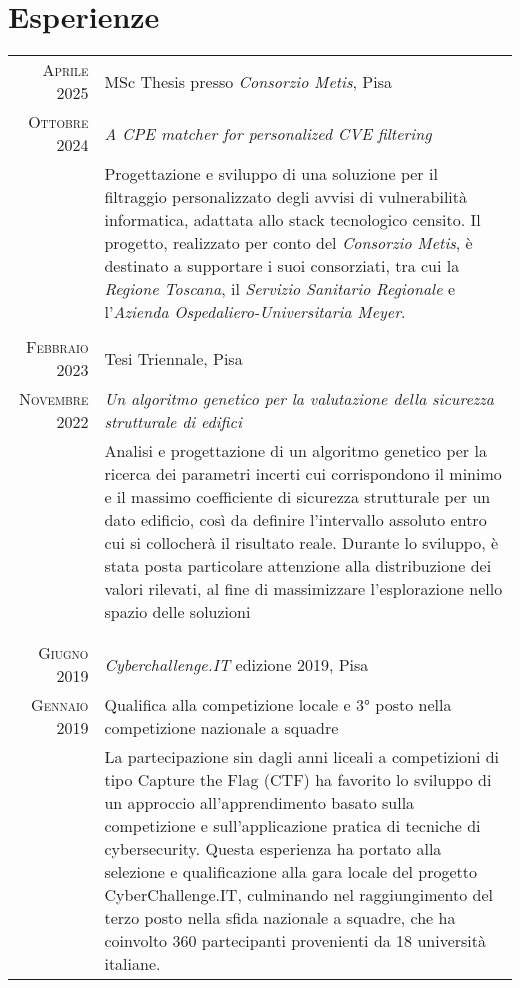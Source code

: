 \documentclass[a4paper,11pt]{article} %
\begin{document}
\section{Esperienze}

\begin{tabular}{r|p{12cm}}
\textsc{Aprile 2025} & MSc Thesis presso \emph{Consorzio Metis}, Pisa\\
\textsc{Ottobre 2024} & \emph{A CPE matcher for personalized CVE filtering}\\ 
& \footnotesize{Progettazione e sviluppo di una soluzione per il filtraggio personalizzato degli avvisi di vulnerabilità informatica, adattata allo stack tecnologico censito. Il progetto, realizzato per conto del \emph{Consorzio Metis}, è destinato a supportare i suoi consorziati, tra cui la \emph{Regione Toscana}, il \emph{Servizio Sanitario Regionale} e l’\emph{Azienda Ospedaliero-Universitaria Meyer}.}\\
\multicolumn{2}{c}{} \\
%
%
\textsc{Febbraio 2023} & Tesi Triennale, Pisa\\
\textsc{Novembre 2022} & \emph{Un algoritmo genetico per la valutazione della sicurezza strutturale di edifici}\\ 
& \footnotesize{Analisi e progettazione di un algoritmo genetico per la ricerca dei parametri incerti cui corrispondono il minimo e il massimo coefficiente di sicurezza strutturale per un dato edificio, così da definire l'intervallo assoluto entro cui si collocherà il risultato reale. Durante lo sviluppo, è stata posta particolare attenzione alla distribuzione dei valori rilevati, al fine di massimizzare l'esplorazione nello spazio delle soluzioni}\\
\\
\multicolumn{2}{c}{} \\
%
%
\textsc{Giugno 2019} & \emph{Cyberchallenge.IT} edizione 2019, Pisa\\
\textsc{Gennaio 2019} & Qualifica alla competizione locale e 3° posto nella competizione nazionale a squadre\\ 
& \footnotesize{La partecipazione sin dagli anni liceali a competizioni di tipo Capture the Flag (CTF) ha favorito lo sviluppo di un approccio all’apprendimento basato sulla competizione e sull’applicazione pratica di tecniche di cybersecurity. Questa esperienza ha portato alla selezione e qualificazione alla gara locale del progetto CyberChallenge.IT, culminando nel raggiungimento del terzo posto nella sfida nazionale a squadre, che ha coinvolto 360 partecipanti provenienti da 18 università italiane.}\\

\end{tabular}
\end{document}
